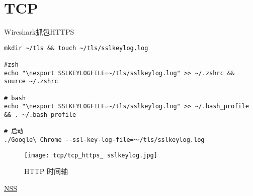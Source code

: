 \chapter{TCP}
\label{chap:tcp}




Wireshark抓包HTTPS

\begin{lstlisting}[style=cshell]
mkdir ~/tls && touch ~/tls/sslkeylog.log

#zsh
echo "\nexport SSLKEYLOGFILE=~/tls/sslkeylog.log" >> ~/.zshrc && source ~/.zshrc

# bash
echo "\nexport SSLKEYLOGFILE=~/tls/sslkeylog.log" >> ~/.bash_profile && . ~/.bash_profile

# 启动
./Google\ Chrome --ssl-key-log-file=～/tls/sslkeylog.log

\end{lstlisting}


\begin{figure}[H]
        \centering
        \texttt{[image: tcp/tcp\_https\_ sslkeylog.jpg]}
        \caption{HTTP 时间轴}
    \end{figure}


    
\href{https://developer.mozilla.org/en-US/docs/Mozilla/Projects/NSS/Key_Log_Format}{NSS}